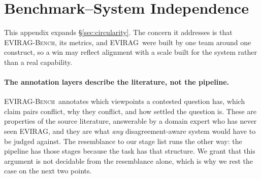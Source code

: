 \documentclass[11pt]{article}
\newcommand{\system}{\textsc{EVIRAG}\xspace}
\newcommand{\bench}{\textsc{EVIRAG-Bench}\xspace}
\begin{document}
\begin{table}[h]
\centering\small
\setlength{\tabcolsep}{3pt}
\caption{Ablation deltas relative to \system\ Full.  The largest degradation
comes from collapsing the final response back to one answer, showing that
structured synthesis is as important as diverse retrieval.}
\label{tab:components}
\end{table}


\section{Benchmark--System Independence}
\label{app:circularity}

This appendix expands \S\ref{sec:circularity}.  The concern it addresses is
that \bench, its metrics, and \system\ were built by one team around one
construct, so a win may reflect alignment with a scale built for the system
rather than a real capability.

\paragraph{The annotation layers describe the literature, not the pipeline.}
\bench\ annotates which viewpoints a contested question has, which claim pairs
conflict, why they conflict, and how settled the question is.  These are
properties of the source literature, answerable by a domain expert who has
never seen \system, and they are what \emph{any} disagreement-aware system
would have to be judged against.  The resemblance to our stage list runs the
other way: the pipeline has those stages because the task has that structure.
We grant that this argument is not decidable from the resemblance alone, which
is why we rest the case on the next two points.
\end{document}
